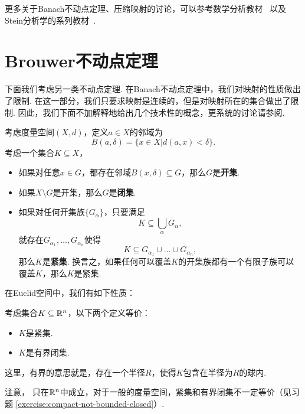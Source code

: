 \begin{remark}
    更多关于Banach不动点定理、压缩映射的讨论，可以参考数学分析教材~\cite{zorichMathematicalAnalysisII2016} 以及Stein分析学的系列教材~\cite{steinRealAnalysisMeasure2005,steinFunctionalAnalysisIntroduction2011}.
\end{remark}

\section{Brouwer不动点定理}

下面我们考虑另一类不动点定理. 在Banach不动点定理中，我们对映射的性质做出了限制. 在这一部分，我们只要求映射是连续的，但是对映射所在的集合做出了限制. 因此，我们下面不加解释地给出几个技术性的概念，更系统的讨论请参阅.

\begin{definition}[开集、闭集和紧集]
    考虑度量空间$(X,d)$，定义$a\in X$的邻域为
    \[B(a,\delta)=\{x\in X|d(a,x)<\delta\}.\]
    考虑一个集合$K\subseteq X$，
\begin{itemize}
    \item 如果对任意$x\in G$，都存在邻域$B(x,\delta)\subseteq G$，那么$G$是\textbf{开集}.
    \item 如果$X\setminus G$是开集，那么$G$是\textbf{闭集}.
    \item 如果对任何开集族$\{G_\alpha\}$，只要满足
    \[K\subseteq \bigcup_\alpha G_\alpha,\]
    就存在$G_{\alpha_1},\dots,G_{\alpha_n}$使得
    \[K\subseteq G_{\alpha_1}\cup\dots\cup G_{\alpha_n},\]
    那么$K$是\textbf{紧集}. 换言之，如果任何可以覆盖$K$的开集族都有一个有限子族可以覆盖$K$，那么$K$是紧集.
\end{itemize}
\end{definition}

在Euclid空间中，我们有如下性质：

\begin{theorem}\label{theorem:compact-set-iff-bounded-closed}
    考虑集合$K\subseteq\mathbb{R}^n$，以下两个定义等价：
    \begin{itemize}
        \item $K$是紧集.
        \item $K$是有界闭集.
    \end{itemize}
\end{theorem}
这里，有界的意思就是，存在一个半径$R$，使得$K$包含在半径为$R$的球内. 

注意， 只在$\mathbb{R}^n$中成立，对于一般的度量空间，紧集和有界闭集不一定等价（见习题 \ref{exercise:compact-not-bounded-closed}）. 

